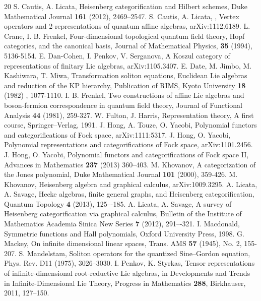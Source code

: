 \documentclass[11pt]{amsart}
\begin{document}
\begin{thebibliography}{20}
 S. Cautis, A. Licata, Heisenberg categorification and Hilbert schemes, Duke Mathematical Journal
 \textbf{161} (2012), 2469--2547.
 S. Cautis, A. Licata, , Vertex operators and 2-representations of quantum affine algebras, arXiv:1112.6189.
 L. Crane, I. B. Frenkel, Four-dimensional topological quantum field theory, Hopf categories, and the canonical basis, Journal of Mathematical 
Physics, \textbf{35} (1994), 5136-5154.
 E. Dan-Cohen, I. Penkov, V. Serganova, A Koszul category of representations of finitary Lie algebras, arXiv:1105.3407.
 E. Date, M. Jimbo, M. Kashiwara, T. Miwa, Transformation soliton equations, Euclidean Lie algebras and reduction of the KP hierarchy, 
Publication of RIMS, Kyoto University \textbf{18} (1982) , 1077-1110.
 I. B. Frenkel, Two constructions of affine Lie algebras and boson-fermion correspondence in quantum field theory, Journal of Functional Analysis \textbf{44} (1981), 259-327.
 W. Fulton, J. Harris, Representation theory, A first course, Springer--Verlag, 1991.
 J. Hong, A. Touze, O. Yacobi, Polynomial functors and categorifications of Fock space, arXiv:1111:5317.
 J. Hong, O. Yacobi, Polynomial representations and categorifications of Fock space, arXiv:1101.2456.
 J. Hong, O. Yacobi, Polynomial functors and categorifications of Fock space II, Advances in Mathematics {\bf 237} (2013) 360--403.         
 M. Khovanov, A categorization of the Jones polynomial, Duke Mathematical Journal \textbf{101} (2000), 359-426.
 M. Khovanov, Heisenberg algebra and graphical calculus, arXiv:1009.3295.
 A. Licata, A. Savage, Hecke algebras, finite general graphs, and Heisenberg categorification, Quantum Topology {\bf 4} (2013), 125–-185. 
 A. Licata, A. Savage, A survey of Heisenberg categorification via graphical calculus, 
Bulletin of the Institute of Mathematics Academia Sinica New Series {\bf 7} (2012), 291–-321. 
 I. Macdonald, Symmetric functions and Hall polynomials, Oxford University Press, 1998.
  G. Mackey, On infinite dimensional linear spaces, Trans. AMS \textbf{57} (1945), No. 2, 155-207.
  S. Mandelstam, Soliton operators for the quantized Sine--Gordon equation, Phys. Rev. D11 (1975), 3026--3030.
 I. Penkov, K. Styrkas, Tensor representations of infinite-dimensional root-reductive Lie algebras, 
in Developments and Trends in Infinite-Dimensional Lie Theory, Progress in Mathematics \textbf{288}, Birkhauser, 2011, 127--150.


\end{thebibliography}
\end{document}
